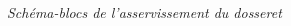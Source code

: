 \documentclass[10pt,fleqn]{article} %
\begin{document}
\begin{multicols}{2}
\begin{center}
\textit{Schéma-blocs de l'asservissement du dosseret \label{fig6}}
\end{center}

%


\end{multicols}
\end{document}
